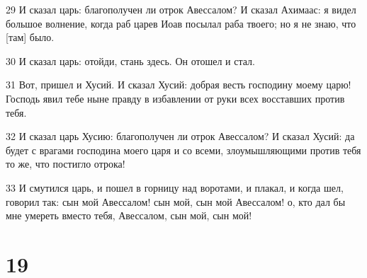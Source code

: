 \par 29 И сказал царь: благополучен ли отрок Авессалом? И сказал Ахимаас: я видел большое волнение, когда раб царев Иоав посылал раба твоего; но я не знаю, что [там] было.
\par 30 И сказал царь: отойди, стань здесь. Он отошел и стал.
\par 31 Вот, пришел и Хусий. И сказал Хусий: добрая весть господину моему царю! Господь явил тебе ныне правду в избавлении от руки всех восставших против тебя.
\par 32 И сказал царь Хусию: благополучен ли отрок Авессалом? И сказал Хусий: да будет с врагами господина моего царя и со всеми, злоумышляющими против тебя то же, что постигло отрока!
\par 33 И смутился царь, и пошел в горницу над воротами, и плакал, и когда шел, говорил так: сын мой Авессалом! сын мой, сын мой Авессалом! о, кто дал бы мне умереть вместо тебя, Авессалом, сын мой, сын мой!

\chapter{19}

